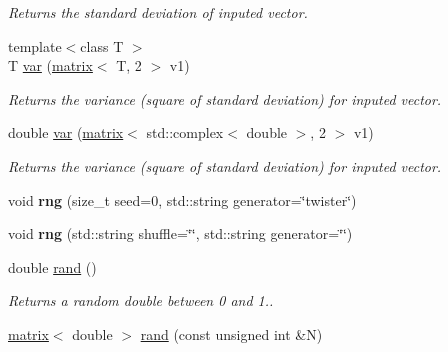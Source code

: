 \begin{DoxyCompactItemize}
\begin{DoxyCompactList}\small\item\em Returns the standard deviation of inputed vector. \end{DoxyCompactList}\item 
\hypertarget{namespacekeycpp_a8ce2d2a4c296ae28d1081f4345c3a947}{{\footnotesize template$<$class T $>$ }\\T \hyperlink{namespacekeycpp_a8ce2d2a4c296ae28d1081f4345c3a947}{var} (\hyperlink{classkeycpp_1_1matrix}{matrix}$<$ T, 2 $>$ v1)}\label{namespacekeycpp_a8ce2d2a4c296ae28d1081f4345c3a947}

\begin{DoxyCompactList}\small\item\em Returns the variance (square of standard deviation) for inputed vector. \end{DoxyCompactList}\item 
\hypertarget{namespacekeycpp_ac94ac14515f1da6cebf6f5d924bd1a35}{double \hyperlink{namespacekeycpp_ac94ac14515f1da6cebf6f5d924bd1a35}{var} (\hyperlink{classkeycpp_1_1matrix}{matrix}$<$ std\-::complex$<$ double $>$, 2 $>$ v1)}\label{namespacekeycpp_ac94ac14515f1da6cebf6f5d924bd1a35}

\begin{DoxyCompactList}\small\item\em Returns the variance (square of standard deviation) for inputed vector. \end{DoxyCompactList}\item 
\hypertarget{namespacekeycpp_a93e133b94bc27c9b984d0383b01772d4}{void {\bfseries rng} (size\-\_\-t seed=0, std\-::string generator=\char`\"{}twister\char`\"{})}\label{namespacekeycpp_a93e133b94bc27c9b984d0383b01772d4}

\item 
\hypertarget{namespacekeycpp_af2478c69f713d8664b53d31f25718530}{void {\bfseries rng} (std\-::string shuffle=\char`\"{}\char`\"{}, std\-::string generator=\char`\"{}\char`\"{})}\label{namespacekeycpp_af2478c69f713d8664b53d31f25718530}

\item 
\hypertarget{namespacekeycpp_a5ef5c1f5951e8182a7c4ec9612f3f7e1}{double \hyperlink{namespacekeycpp_a5ef5c1f5951e8182a7c4ec9612f3f7e1}{rand} ()}\label{namespacekeycpp_a5ef5c1f5951e8182a7c4ec9612f3f7e1}

\begin{DoxyCompactList}\small\item\em Returns a random double between 0 and 1.. \end{DoxyCompactList}\item 
\hypertarget{namespacekeycpp_ab99a9561cf5654ae722a0879b41d9d73}{\hyperlink{classkeycpp_1_1matrix}{matrix}$<$ double $>$ \hyperlink{namespacekeycpp_ab99a9561cf5654ae722a0879b41d9d73}{rand} (const unsigned int \&N)}\label{namespacekeycpp_ab99a9561cf5654ae722a0879b41d9d73}


\end{DoxyCompactItemize}

